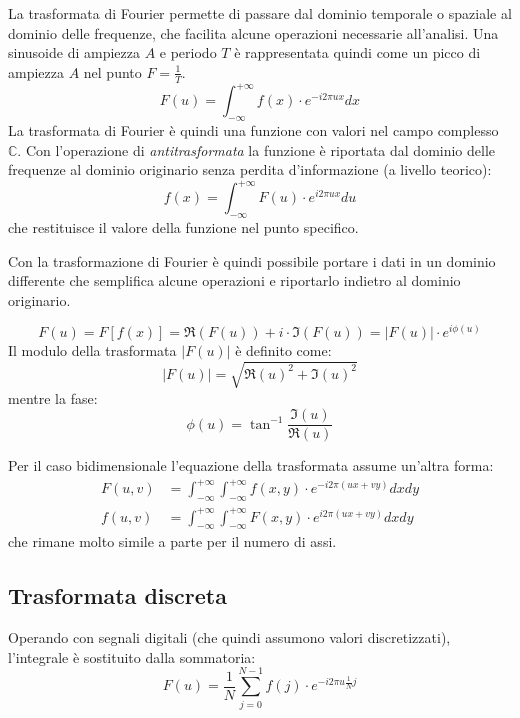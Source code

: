 \documentclass[11pt, a4page]{article}
\begin{document}
La trasformata di Fourier permette di passare dal dominio temporale o spaziale al dominio delle frequenze, che facilita alcune operazioni necessarie all'analisi.
Una sinusoide di ampiezza $A$ e periodo $T$ è rappresentata quindi come un picco di ampiezza $A$ nel punto $F = \frac{1}{T}$.
\begin{equation*}
  F(u) = \int_{-\infty}^{+\infty}f(x) \cdot e^{-i 2\pi ux}dx
\end{equation*}
La trasformata di Fourier è quindi una funzione con valori nel campo complesso $\mathbb{C}$.
Con l'operazione di \textit{antitrasformata} la funzione è riportata dal dominio delle frequenze al dominio originario senza perdita d'informazione (a livello teorico):
\begin{equation*}
  f(x) = \int_{-\infty}^{+\infty}F(u) \cdot e^{i 2\pi ux} du
\end{equation*}
che restituisce il valore della funzione nel punto specifico.

Con la trasformazione di Fourier è quindi possibile portare i dati in un dominio differente che semplifica alcune operazioni e riportarlo indietro al dominio originario.

\begin{equation*}
  F(u) = F[f(x)] = \Re(F(u)) + i \cdot \Im(F(u)) = |F(u)| \cdot e^{i \phi(u)}
\end{equation*}
Il modulo della trasformata $|F(u)|$ è definito come:
\begin{equation*}
  |F(u)| = \sqrt{\Re(u)^2 + \Im(u)^2}
\end{equation*}
mentre la fase:
\begin{equation*}
  \phi(u) = \tan^{-1}\frac{\Im(u)}{\Re(u)}
\end{equation*}
\newline

Per il caso bidimensionale l'equazione della trasformata assume un'altra forma:
\begin{align*}
  F(u, v) &= \int_{-\infty}^{+\infty}\int_{-\infty}^{+\infty}f(x, y) \cdot e^{-i2\pi(ux + vy)} dx dy \\
  f(u, v) &= \int_{-\infty}^{+\infty}\int_{-\infty}^{+\infty}F(x, y) \cdot e^{i2\pi(ux + vy)} dx dy
\end{align*}
che rimane molto simile a parte per il numero di assi. \newline

\subsection{{Trasformata discreta}}
Operando con segnali digitali (che quindi assumono valori discretizzati), l'integrale è sostituito dalla sommatoria:
\begin{equation*}
  F(u) = \frac{1}{N} \sum_{j=0}^{N-1} f(j) \cdot e^{-i 2 \pi u \frac{1}{N} j}
\end{equation*}
\end{document}
